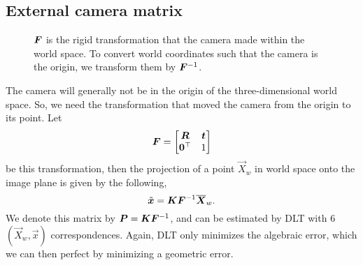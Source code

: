 \subsection{External camera matrix}

\begin{figure}[ht]
    \centering
    \caption{$\bm{F}$ is the rigid transformation that the camera made within
    the world space. To convert world coordinates such that the camera is the
    origin, we transform them by $\bm{F}^{-1}$.}
    \label{fig:pinhole-in-space}
\end{figure}

The camera will generally not be in the origin of the three-dimensional world
space. So, we need the transformation that moved the camera from the origin
to its point. Let \[
  \bm{F}=\begin{bmatrix} \bm{R} & \bm{t} \\ \bm{0}^\top & 1 \end{bmatrix}
\]
be this transformation, then the projection of a point $\vec{X}_w$ in
world space onto the image plane is given by the following, \[
  \tilde{\bm{x}} = \bm{K}\bm{F}^{-1}\overline{\bm{X}}_w
.\]
We denote this matrix by $\bm{P} = \bm{K}\bm{F}^{-1}$, and can be estimated by DLT with 6
$(\vec{X}_w,\vec{x})$ correspondences. Again, DLT only minimizes the algebraic
error, which we can then perfect by minimizing a geometric error.
